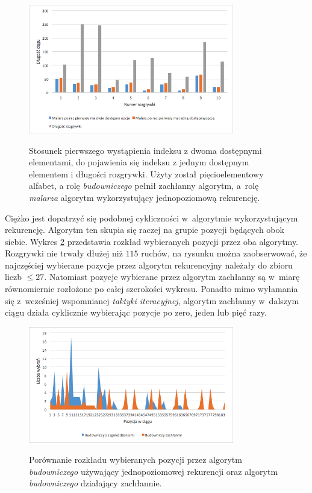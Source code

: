 \documentclass[document]{xmgr}
\begin{document}
\begin{figure}[tbh]
    \centering
    \caption{Stosunek pierwszego wystąpienia indeksu z dwoma dostępnymi elementami, do pojawienia się indeksu z jednym dostępnym elementem i długości rozgrywki. Użyty został pięcioelementowy alfabet, a rolę \emph{budowniczego} pełnił zachłanny algorytm, a~rolę \emph{malarza} algorytm wykorzystujący jednopoziomową rekurencję.}
    \includegraphics[width = 0.8\textwidth]{images2/builder0efficiency}
    \label{fig:builder0Efficiency}
\end{figure}

Ciężko jest dopatrzyć się podobnej cykliczności w~algorytmie wykorzystującym rekurencję. Algorytm ten skupia się raczej na grupie pozycji będących obok siebie. Wykres \ref{fig:buildersPickedIndexes} przedstawia rozkład wybieranych pozycji przez oba algorytmy. Rozgrywki nie trwały dłużej niż $115$ ruchów, na rysunku można zaobserwować, że najczęściej wybierane pozycje przez algorytm rekurencyjny należały do zbioru liczb $\leq 27$. Natomiast pozycje wybierane przez algorytm zachłanny są w~miarę równomiernie rozłożone po całej szerokości wykresu. Ponadto mimo wyłamania się z~wcześniej wspomnianej \emph{taktyki iteracyjnej}, algorytm zachłanny w~dalszym ciągu działa cyklicznie wybierając pozycje po zero, jeden lub pięć razy.

\begin{figure}[tbh]
    \centering
    \caption{Porównanie rozkładu wybieranych pozycji przez algorytm \emph{budowniczego} używający jednopoziomowej rekurencji oraz algorytm \emph{budowniczego} działający zachłannie.}
    \includegraphics[width = 0.8\textwidth]{images2/buildersPickedIndexes}
    \label{fig:buildersPickedIndexes}
\end{figure}
\end{document}
